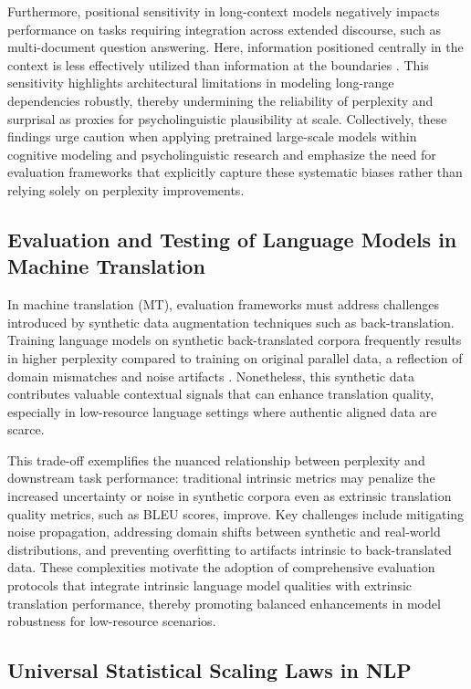 \documentclass[sigconf]{acmart}
\begin{document}
Furthermore, positional sensitivity in long-context models negatively impacts performance on tasks requiring integration across extended discourse, such as multi-document question answering. Here, information positioned centrally in the context is less effectively utilized than information at the boundaries \cite{ref33}. This sensitivity highlights architectural limitations in modeling long-range dependencies robustly, thereby undermining the reliability of perplexity and surprisal as proxies for psycholinguistic plausibility at scale. Collectively, these findings urge caution when applying pretrained large-scale models within cognitive modeling and psycholinguistic research and emphasize the need for evaluation frameworks that explicitly capture these systematic biases rather than relying solely on perplexity improvements.

\subsection{Evaluation and Testing of Language Models in Machine Translation}

In machine translation (MT), evaluation frameworks must address challenges introduced by synthetic data augmentation techniques such as back-translation. Training language models on synthetic back-translated corpora frequently results in higher perplexity compared to training on original parallel data, a reflection of domain mismatches and noise artifacts \cite{ref37}. Nonetheless, this synthetic data contributes valuable contextual signals that can enhance translation quality, especially in low-resource language settings where authentic aligned data are scarce.

This trade-off exemplifies the nuanced relationship between perplexity and downstream task performance: traditional intrinsic metrics may penalize the increased uncertainty or noise in synthetic corpora even as extrinsic translation quality metrics, such as BLEU scores, improve. Key challenges include mitigating noise propagation, addressing domain shifts between synthetic and real-world distributions, and preventing overfitting to artifacts intrinsic to back-translated data. These complexities motivate the adoption of comprehensive evaluation protocols that integrate intrinsic language model qualities with extrinsic translation performance, thereby promoting balanced enhancements in model robustness for low-resource scenarios.

\subsection{Universal Statistical Scaling Laws in NLP}
\end{document}
